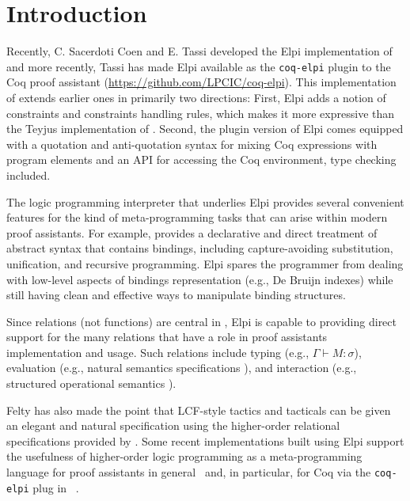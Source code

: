 \section{Introduction}
\label{sec:intro}

Recently, C. Sacerdoti Coen and E. Tassi developed the Elpi
implementation \cite{dunchev15lpar} of \lP \cite{miller12proghol} and
more recently, Tassi has made Elpi available as the \texttt{coq-elpi}
plugin to the Coq proof assistant \cite{tassi18coqpl}
(\url{https://github.com/LPCIC/coq-elpi}).  This implementation of \lP
extends earlier ones in primarily two directions: First, Elpi adds a
notion of constraints and constraints handling rules, which makes it
more expressive than the Teyjus implementation \cite{nadathur99cade}
of \lP. Second, the plugin version of Elpi comes equipped with a
quotation and anti-quotation syntax for mixing Coq expressions with
\lP program elements and an API for accessing the Coq environment,
type checking included.

The logic programming interpreter that underlies Elpi provides several
convenient features for the kind of meta-programming tasks that can
arise within modern proof assistants.  For example, \lP provides a
declarative and direct treatment of abstract syntax that contains
bindings, including capture-avoiding substitution,
unification, and recursive programming.  Elpi spares the
programmer from dealing with low-level aspects of bindings
representation (e.g., De Bruijn indexes) while still having clean and
effective ways to manipulate binding structures.

Since relations (not functions) are central in \lP, Elpi is capable to
providing direct support for the many relations that have a role in
proof assistants implementation and usage.  Such relations include
typing (e.g., $\Gamma\vdash M\colon\sigma$), evaluation (e.g., natural
semantics specifications \cite{kahn87stacs,hannan93jfp}), and
interaction (e.g., structured operational semantics
\cite{milner89book,plotkin81}).

Felty has also made the point that LCF-style tactics and tacticals can
be given an elegant and natural specification using the higher-order
relational specifications provided by \lP \cite{felty93jar}.  Some
recent implementations built using Elpi support the usefulness of
higher-order logic programming as a meta-programming language for
proof assistants in general~\cite{DunchevCT16,coen19mscs} and, in
particular, for Coq via the \texttt{coq-elpi} plug
in~\cite{CohenST20,tassi19itp} .


